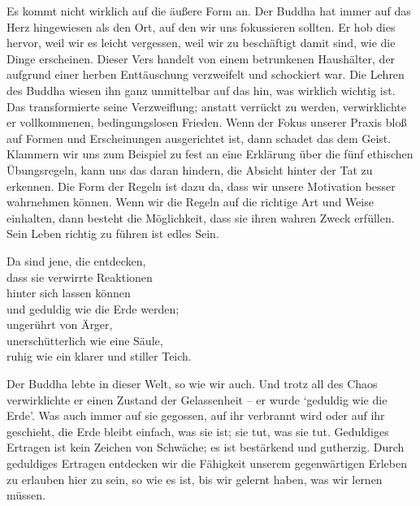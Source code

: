 \begin{dhpRefl}

Es kommt nicht wirklich auf die äußere Form an. Der Buddha hat immer auf das
Herz hingewiesen als den Ort, auf den wir uns fokussieren sollten. Er hob dies
hervor, weil wir es leicht vergessen, weil wir zu beschäftigt damit sind, wie
die Dinge erscheinen. Dieser Vers handelt von einem betrunkenen Haushälter,
der aufgrund einer herben Enttäuschung verzweifelt und schockiert war. Die
Lehren des Buddha wiesen ihn ganz unmittelbar auf das hin, was wirklich
wichtig ist. Das transformierte seine Verzweiflung; anstatt verrückt zu
werden, verwirklichte er vollkommenen, bedingungslosen Frieden. Wenn der Fokus
unserer Praxis bloß auf Formen und Erscheinungen ausgerichtet ist, dann
schadet das dem Geist. Klammern wir uns zum Beispiel zu fest an eine Erklärung
über die fünf ethischen Übungsregeln, kann uns das daran hindern, die Absicht
hinter der Tat zu erkennen. Die Form der Regeln ist dazu da, dass wir unsere
Motivation besser wahrnehmen können. Wenn wir die Regeln auf die richtige Art
und Weise einhalten, dann besteht die Möglichkeit, dass sie ihren wahren Zweck
erfüllen. Sein Leben richtig zu führen ist edles Sein.

\end{dhpRefl}


\begin{dhpVerse}{95}
\label{dhp-95}
Da sind jene, die entdecken,\\ 
dass sie verwirrte Reaktionen\\ 
hinter sich lassen können\\ 
und geduldig wie die Erde werden;\\ 
ungerührt von Ärger,\\ 
unerschütterlich wie eine Säule,\\ 
ruhig wie ein klarer und stiller Teich. 
\end{dhpVerse}

\begin{dhpRefl}

Der Buddha lebte in dieser Welt, so wie wir auch. Und trotz all des Chaos
verwirklichte er einen Zustand der Gelassenheit -- er wurde `geduldig wie die
Erde'. Was auch immer auf sie gegossen, auf ihr verbrannt wird oder auf ihr
geschieht, die Erde bleibt einfach, was sie ist; sie tut, was sie tut.
Geduldiges Ertragen ist kein Zeichen von Schwäche; es ist bestärkend und
gutherzig. Durch geduldiges Ertragen entdecken wir die Fähigkeit unserem
gegenwärtigen Erleben zu erlauben hier zu sein, so wie es ist, bis wir gelernt
haben, was wir lernen müssen.

\end{dhpRefl}

